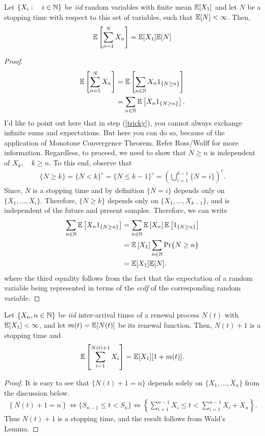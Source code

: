 \documentclass[a4paper,10pt, english]{article}
\begin{document}
\begin{lem}
	Let $\{X_i:\quad i\in \mathbb{N}\}$ be \emph{iid} random variables with finite mean $\mathbb{E}[X_1]$ and let $N$ be a stopping time with respect to this set of variables, such that $\mathbb{E}[N] < \infty$. Then,
	\[\mathbb{E}\left[\sum_{n=1}^N X_n\right] = \mathbb{E}[X_1]\mathbb{E}[N]\]
\end{lem}
\begin{proof}
	\begin{align}
	\mathbb{E}\left[\sum_{n=1}^N X_n\right] &= \mathbb{E}\left[\sum_{n \in \mathbb{N}} X_n 1_{\{N \geq n\}}\right]  \\
	&= \sum_{n \in \mathbb{N}} \mathbb{E}\left[X_n 1_{\{N \geq n\}}\right]. \label{tricky}
	\end{align}
	I'd like to point out here that in step (\ref{tricky}), you cannot always exchange infinite sums and expectations. But here you can do so, because of the application of Monotone Convergence Theorem. Refer Ross/Wolff for more information. Regardless, to proceed, we need to show that $N \geq n$ is independent of $X_k, \quad k \geq n$. To this end, observe that 
	\begin{align*}
	\{N \geq k\} = \{N < k\}^c = \{N \leq k-1\}^c = \left(\bigcup_{i=1}^{k-1} \{N = i\}\right)^c. 
	\end{align*}
	Since, $N$ is a stopping time and by definition $\{N=i\}$ depends only on $\{X_1,\ldots, X_i\}$. Therefore, $\{N \geq k\}$ depends only on $\{X_1,\ldots, X_{k-1}\}$, and is independent of the future and present samples. Therefore, we can write
	\begin{align*}
	\sum_{n \in \mathbb{N}} \mathbb{E}\left[X_n 1_{\{N \geq n\}}\right] &= \sum_{n \in \mathbb{N}} \mathbb{E}\left[X_n\right]\mathbb{E}\left[ 1_{\{N \geq n\}}\right] \\
	&= \mathbb{E}\left[X_1\right] \sum_{n \in \mathbb{N}} \Pr\{N \geq n\} \\
	&= \mathbb{E}[X_1]\mathbb{E}[N].
	\end{align*} 
	where the third equality follows from the fact that the expectation of a random variable being represented in terms of the \emph{ccdf} of the corresponding random variable.
\end{proof}

\begin{prop} \label{prop:WaldRenewal}
	Let $\{X_n, n \in \mathbb{N}\}$ be \emph{iid} inter-arrival times of a renewal process $N(t)$ with $\mathbb{E}[X_1] < \infty$, and let $m(t) = \mathbb{E}[N(t)]$ be its renewal function. Then, $N(t)+1$ is a stopping time and 
	\begin{align*}
	\mathbb{E}\left[\sum_{i=1}^{N(t)+1}X_i\right] = \mathbb{E}[X_1][1+m(t)].
	\end{align*}
\end{prop}
\begin{proof} It is easy to see that $\{N(t)+1=n\}$ depends solely on $\{X_1,\ldots,X_n\}$ from the discussion below.
	\begin{align*}
	\left\{N(t) + 1 = n \right\} \iff \{S_{n-1} \leq t < S_n\} \iff \left\{\sum_{i=1}^{n-1} X_i \leq t < \sum_{i=1}^{n-1} X_i + X_n\right\}.
	\end{align*}
	Thus $N(t)+1$ is a stopping time, and the result follows from Wald's Lemma.
\end{proof}
\end{document}
